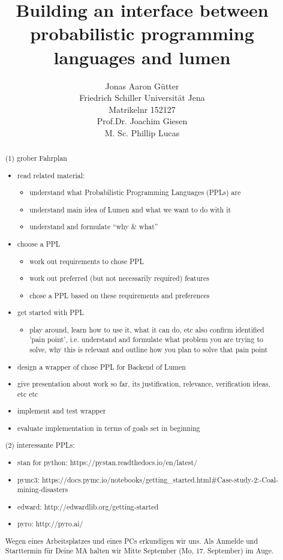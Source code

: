 \documentclass{article}
\title{Building an interface between probabilistic programming languages and lumen}
\author{Jonas Aaron Gütter  \\
	Friedrich Schiller Universität Jena  \\
    Matrikelnr 152127 \\
    Prof.Dr. Joachim Giesen \\
    M. Sc. Phillip Lucas
	}
\begin{document}
\maketitle


\begin{abstract}
(1) grober Fahrplan
\begin{itemize}
   \item read related material:
        \begin{itemize}
        \item understand what Probabilistic Programming Languages (PPLs) are
        \item understand main idea of Lumen and what we want to do with it
        \item understand and formulate “why \& what”
        \end{itemize}
    \item choose a PPL
        \begin{itemize}
        \item work out requirements to chose PPL
        \item work out preferred (but not necessarily required) features
        \item chose a PPL based on these requirements and preferences
        \end{itemize}
    \item get started with PPL
    	\begin{itemize}
        \item play around, learn how to use it, what it can do, etc
              also confirm identified 'pain point', i.e. understand and
              formulate what problem you are trying to solve, why this is
              relevant and outline how you plan to solve that pain point
        \end{itemize}
    \item design a wrapper of chose PPL for Backend of Lumen
    \item give presentation about work so far, its justification, relevance, verification ideas, etc etc
    \item implement and test wrapper
    \item evaluate implementation in terms of goals set in beginning

\end{itemize}
(2) interessante PPLs:

\begin{itemize}
     \item stan for python: https://pystan.readthedocs.io/en/latest/
    \item pymc3: https://docs.pymc.io/notebooks/getting\_started.html\#Case-study-2:-Coal-mining-disasters
    \item edward: http://edwardlib.org/getting-started
    \item pyro: http://pyro.ai/
\end{itemize}
Wegen eines Arbeitsplatzes und eines PCs erkundigen wir uns.
Als Anmelde und Starttermin für Deine MA halten wir Mitte September (Mo, 17. September) im Auge.

\end{abstract}
\end{document}
